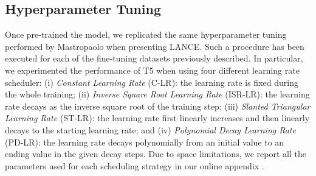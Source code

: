 \subsection{Hyperparameter Tuning}
Once pre-trained the model, we replicated the same hyperparameter tuning performed by Mastropaolo \etal \cite{mastropaolo2021studying} when presenting LANCE. Such a procedure has been executed for each of the fine-tuning datasets previously described. In particular, we experimented the performance of T5 when using four different learning rate scheduler: (i) \textit{Constant Learning Rate} (C-LR): the learning rate is fixed during the whole training; (ii) \textit{Inverse Square Root Learning Rate} (ISR-LR): the learning rate decays as the inverse square root of the training step; (iii) \textit{Slanted Triangular Learning Rate \cite{howard2018universal}} (ST-LR): the learning rate first linearly increases and then linearly decays to the starting learning rate; and (iv) \textit{Polynomial Decay Learning Rate} (PD-LR): the learning rate decays polynomially from an initial value to an ending value in the given decay steps. Due to space limitations, we report all the parameters used for each scheduling strategy in our online appendix \cite{replication}.


